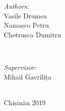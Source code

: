 \begin{titlepage}
\begin{center}
      \begin{minipage}{0.4\textwidth}
      \begin{flushleft} \large
      \emph{Authors:}\\
      Vasile Drumea \\
      Namașco Petru \\
      Chetrușca Dumitru \\
      \end{flushleft}
      \end{minipage}
      ~
      \begin{minipage}{0.4\textwidth}
      \begin{flushright} \large
      \emph{Supervisor:} \\
      Mihail Gavrilița
      \vspace{1.7cm} %
      \end{flushright}
      \end{minipage}\\[4cm]

      \vspace{15 mm}
      \Large
      Chișinău 2019






      \vfill %
      \end{center}
      
\end{titlepage}


